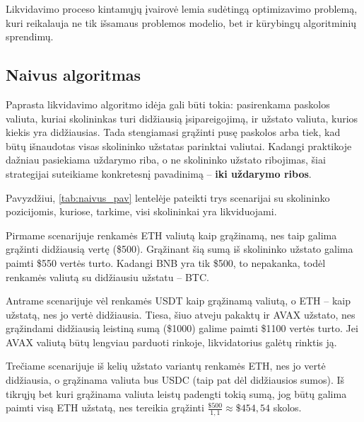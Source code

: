 \documentclass{VUMIFPSkursinis}
\begin{document}
Likvidavimo proceso kintamųjų įvairovė lemia sudėtingą optimizavimo problemą, kuri reikalauja ne tik išsamaus problemos modelio, bet ir kūrybingų algoritminių sprendimų.

\subsection{Naivus algoritmas}

Paprasta likvidavimo algoritmo idėja gali būti tokia: pasirenkama paskolos valiuta, kuriai skolininkas turi didžiausią įsipareigojimą, ir užstato valiuta, kurios kiekis yra didžiausias. Tada stengiamasi grąžinti pusę paskolos arba tiek, kad būtų išnaudotas visas skolininko užstatas parinktai valiutai. Kadangi praktikoje dažniau pasiekiama uždarymo riba, o ne skolininko užstato ribojimas, šiai strategijai suteikiame konkretesnį pavadinimą – \textbf{iki uždarymo ribos}.

Pavyzdžiui, \ref{tab:naivus_pav} lentelėje pateikti trys scenarijai su skolininko pozicijomis, kuriose, tarkime, visi skolininkai yra likviduojami.

Pirmame scenarijuje renkamės ETH valiutą kaip grąžinamą, nes taip galima grąžinti didžiausią vertę (\$500). Grąžinant šią sumą iš skolininko užstato galima paimti \$550 vertės turto. Kadangi BNB yra tik \$500, to nepakanka, todėl renkamės valiutą su didžiausiu užstatu – BTC.

Antrame scenarijuje vėl renkamės USDT kaip grąžinamą valiutą, o ETH – kaip užstatą, nes jo vertė didžiausia. Tiesa, šiuo atveju pakaktų ir AVAX užstato, nes grąžindami didžiausią leistiną sumą (\$1000) galime paimti \$1100 vertės turto. Jei AVAX valiutą būtų lengviau parduoti rinkoje, likvidatorius galėtų rinktis ją.

Trečiame scenarijuje iš kelių užstato variantų renkamės ETH, nes jo vertė didžiausia, o grąžinama valiuta bus USDC (taip pat dėl didžiausios sumos). Iš tikrųjų bet kuri grąžinama valiuta leistų padengti tokią sumą, jog būtų galima paimti visą ETH užstatą, nes tereikia grąžinti $\frac{\$500}{1,1} \approx \$454,54$ skolos.
\end{document}
